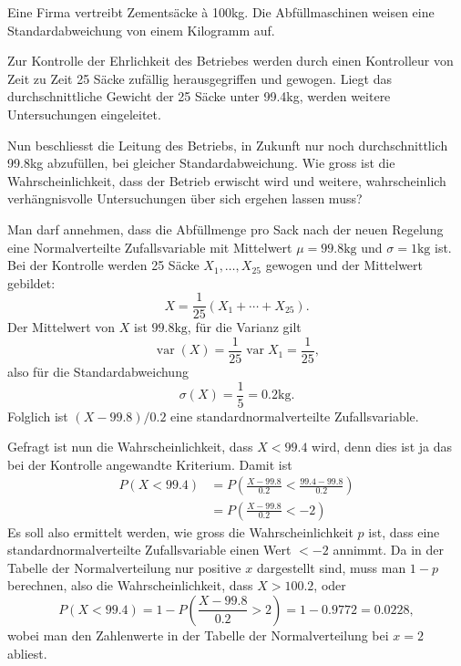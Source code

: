 Eine Firma vertreibt Zementsäcke \`a 100kg. Die Abfüllmaschinen weisen
eine Standardabweichung von einem Kilogramm auf.

Zur Kontrolle der Ehrlichkeit des Betriebes werden durch einen Kontrolleur
von Zeit zu Zeit 25 Säcke zufällig herausgegriffen und gewogen. Liegt
das durchschnittliche Gewicht der 25 Säcke unter 99.4kg, werden weitere
Untersuchungen eingeleitet.

Nun beschliesst die Leitung des Betriebs, in Zukunft nur noch durchschnittlich
99.8kg abzufüllen, bei gleicher Standardabweichung. Wie gross ist die
Wahrscheinlichkeit, dass der Betrieb erwischt wird und weitere, wahrscheinlich
verhängnisvolle Untersuchungen über sich ergehen lassen muss?

\begin{loesung}
Man darf annehmen, dass die Abfüllmenge pro Sack nach der neuen Regelung
eine Normalverteilte Zufallsvariable mit Mittelwert $\mu=99.8\text{kg}$ und
$\sigma=1\text{kg}$ ist. Bei der Kontrolle werden 25 Säcke $X_1,\dots,X_{25}$
gewogen und der Mittelwert gebildet:
\[
X=\frac1{25}(X_1+\cdots +X_{25}).
\]
Der Mittelwert von $X$ ist $99.8\text{kg}$, für die Varianz gilt
\[
\operatorname{var}(X)=\frac1{25}\operatorname{var}{X_1}=\frac1{25},
\]
also für die Standardabweichung
\[
\sigma(X)=\frac15=0.2\text{kg}.
\]
Folglich ist $(X-99.8)/0.2$ eine standardnormalverteilte Zufallsvariable.

Gefragt ist nun die Wahrscheinlichkeit, dass $X<99.4$ wird, denn dies ist ja
das bei der Kontrolle angewandte Kriterium. Damit ist
\begin{align*}
P(X<99.4)
&=P\left(\frac{X-99.8}{0.2} < \frac{99.4-99.8}{0.2}\right)\\
&=P\left(\frac{X-99.8}{0.2} < -2\right)
\end{align*}
Es soll also ermittelt werden, wie gross die Wahrscheinlichkeit $p$ ist, dass
eine standardnormalverteilte Zufallsvariable einen Wert $<-2$ annimmt.
Da in der Tabelle der Normalverteilung nur positive $x$ dargestellt sind,
muss man $1-p$ berechnen, also die Wahrscheinlichkeit, dass $X>100.2$,
oder
\[
P(X<99.4)=1-P\left(\frac{X-99.8}{0.2}>2\right)
=1-0.9772=0.0228,
\]
wobei man den Zahlenwerte in der Tabelle der Normalverteilung bei $x=2$ abliest.
\end{loesung}

